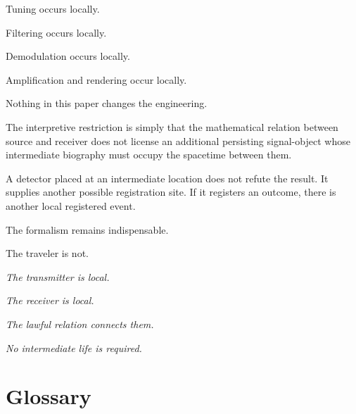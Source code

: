 \documentclass[12pt,onecolumn]{article}
\begin{document}
Tuning occurs locally.

Filtering occurs locally.

Demodulation occurs locally.

Amplification and rendering occur locally.

Nothing in this paper changes the engineering.

The interpretive restriction is simply that the mathematical relation
between source and receiver does not license an additional persisting
signal-object whose intermediate biography must occupy the spacetime
between them.

A detector placed at an intermediate location does not refute the result.
It supplies another possible registration site. If it registers an
outcome, there is another local registered event.

The formalism remains indispensable.

The traveler is not.

\vspace{1em}

\begin{center}

\textit{The transmitter is local.}

\vspace{0.4em}

\textit{The receiver is local.}

\vspace{0.4em}

\textit{The lawful relation connects them.}

\vspace{0.4em}

\textit{No intermediate life is required.}

\end{center}

\section*{Glossary}
\end{document}
